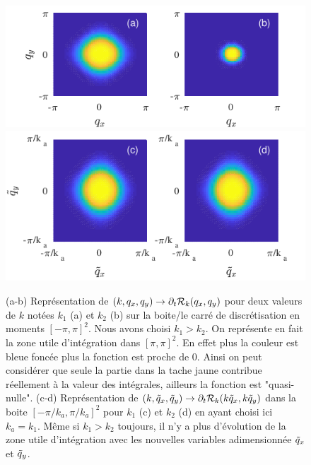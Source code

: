 \documentclass[10.5pt]{article}
\begin{document}
\begin{multicols}{2}
\begin{figure}[H]
\begin{center}
	\includegraphics[width=0.95\columnwidth]{DerRegIsing.pdf}
	\includegraphics[width=0.95\columnwidth, height = 0.4\columnwidth]{DerRegIsing2.pdf}
\end{center}
\caption{(a-b) Représentation  de $(k, q_x, q_y) \to \partial_t \mathcal{R}_k(q_x, q_y)$ pour deux valeurs de  $k$ notées $k_1$ (a) et $k_2$ (b) sur la boite/le carré de discrétisation en moments $[-\pi, \pi]^2$. Nous avons choisi $k_1>k_2$. On représente en fait la zone utile d'intégration dans $[\pi, \pi]^2$. En effet plus la couleur est bleue foncée plus la fonction est proche de 0. Ainsi on peut considérer que seule la partie dans la tache jaune contribue réellement à la valeur des intégrales, ailleurs la fonction est "quasi-nulle". (c-d) Représentation de $(k, \tilde{q}_x, \tilde{q}_y) \to \partial_t \mathcal{R}_k(k\tilde{q}_x, k\tilde{q}_y)$ dans la boite $[-\pi/k_a, \pi/k_a]^2$ pour  $k_1$ (c) et $k_2$ (d) en ayant choisi ici $k_a = k_1$. Même si $k_1>k_2$ toujours, il n'y a plus d'évolution de la zone utile d'intégration avec les nouvelles variables adimensionnée $\tilde{q}_x$ et $\tilde{q}_y$.}
\label{fig:DerRegIsing}
\end{figure}


\end{multicols}
\end{document}
